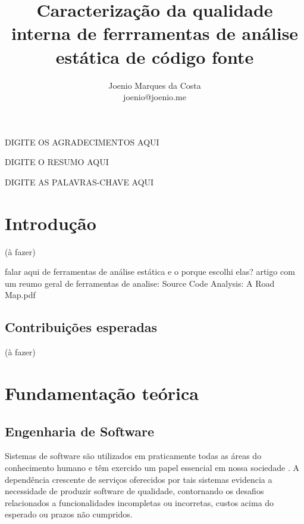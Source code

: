 \documentclass[qual, classic, a4paper]{ufbathesis}
\title{
  Caracterização da qualidade interna de ferrramentas de análise estática de
  código fonte
}
\author{Joenio Marques da Costa\\
  {\small joenio@joenio.me}
}
\begin{document}
\frontpage
\frontmatter
\presentationpage

\acknowledgements
DIGITE OS AGRADECIMENTOS AQUI

\resumo
DIGITE O RESUMO AQUI

\begin{keywords}
DIGITE AS PALAVRAS-CHAVE AQUI
\end{keywords}

%

\tableofcontents
\listoffigures
\listoftables
\mainmatter

\chapter{Introdução}

(à fazer)

falar aqui de ferramentas de análise estática e o porque escolhi elas? artigo
com um reumo geral de ferramentas de analise: Source Code Analysis: A Road Map.pdf

\section{Contribuições esperadas}

(à fazer)

\chapter{Fundamentação teórica}

% 
% 
% 
% 

\section{Engenharia de Software}

Sistemas de software são utilizados em praticamente todas as áreas do
conhecimento humano e têm exercido um papel essencial em nossa sociedade
\cite{Mafra2006}. A dependência crescente de serviços oferecidos por tais
sistemas evidencia a necessidade de produzir software de qualidade,
contornando os  desafios relacionados a funcionalidades incompletas ou
incorretas, custos acima do esperado ou prazos não cumpridos.
\end{document}
